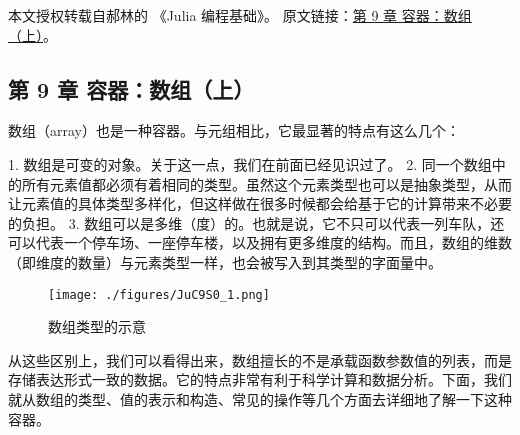 
本文授权转载自郝林的 《Julia 编程基础》。 原文链接：\href{https://github.com/hyper0x/JuliaBasics/blob/master/book/ch09.md}{第 9 章 容器：数组（上）}。


\subsection{第 9 章 容器：数组（上）}

数组（array）也是一种容器。与元组相比，它最显著的特点有这么几个：

1. 数组是可变的对象。关于这一点，我们在前面已经见识过了。
2. 同一个数组中的所有元素值都必须有着相同的类型。虽然这个元素类型也可以是抽象类型，从而让元素值的具体类型多样化，但这样做在很多时候都会给基于它的计算带来不必要的负担。
3. 数组可以是多维（度）的。也就是说，它不只可以代表一列车队，还可以代表一个停车场、一座停车楼，以及拥有更多维度的结构。而且，数组的维数（即维度的数量）与元素类型一样，也会被写入到其类型的字面量中。

\begin{figure}[ht]
\centering
\texttt{[image: ./figures/JuC9S0\_1.png]}
\caption{数组类型的示意} \label{JuC9S0_fig1}
\end{figure}

从这些区别上，我们可以看得出来，数组擅长的不是承载函数参数值的列表，而是存储表达形式一致的数据。它的特点非常有利于科学计算和数据分析。下面，我们就从数组的类型、值的表示和构造、常见的操作等几个方面去详细地了解一下这种容器。